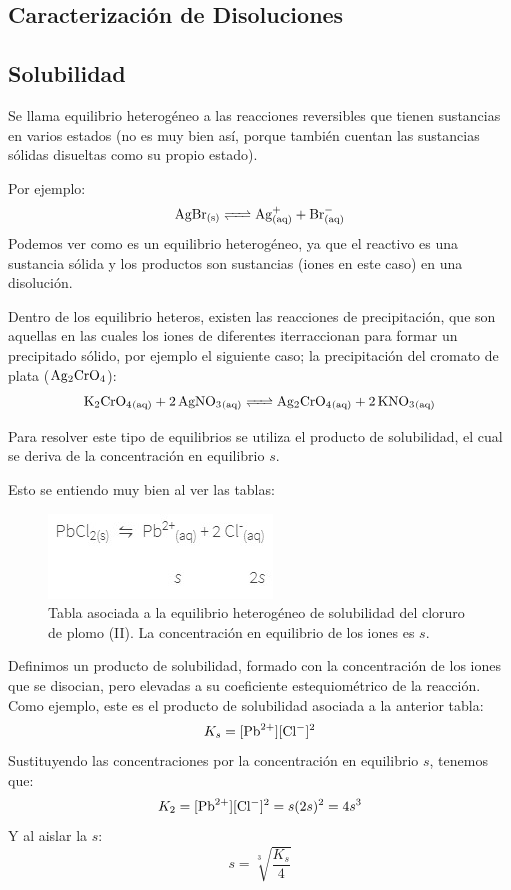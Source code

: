 \documentclass[arial,a4paper,print]{article}
\begin{document}
\subsection{Caracterización de Disoluciones}

\subsection{Solubilidad}
Se llama equilibrio heterogéneo a las reacciones reversibles que tienen sustancias en varios estados (no es muy bien así, porque también cuentan las sustancias sólidas disueltas como su propio estado). 

Por ejemplo:
\begin{equation*}
	\ce{AgBr_{(s)} <=> Ag^+_{(aq)} + Br^-_{(aq)}}
\end{equation*}
Podemos ver como es un equilibrio heterogéneo, ya que el reactivo es una sustancia sólida y los productos son sustancias (iones en este caso) en una disolución. 

Dentro de los equilibrio heteros, existen las reacciones de precipitación, que son aquellas en las cuales los iones de diferentes iterraccionan para formar un precipitado sólido, por ejemplo el siguiente caso; la precipitación del cromato de plata ($\ce{Ag2CrO4}$):
\begin{equation*}
	\ce{K2CrO4_{(aq)} + 2AgNO3_{(aq)} <=> Ag2CrO4_{(aq)} + 2KNO3_{(aq)}}
\end{equation*}

Para resolver este tipo de equilibrios se utiliza el producto de solubilidad, el cual se deriva de la concentración en equilibrio $s$. 

Esto se entiendo muy bien al ver las tablas:
\begin{figure}[H]
	\centering
	\includegraphics[width=0.3\linewidth]{figures/tabla_s}
	\caption{Tabla asociada a la equilibrio heterogéneo de solubilidad del cloruro de plomo (II). La concentración en equilibrio de los iones es $s$.}
	\label{fig:tablas}
\end{figure}

Definimos un producto de solubilidad, formado con la concentración de los iones que se disocian, pero elevadas a su coeficiente estequiométrico de la reacción. Como ejemplo, este es el producto de solubilidad asociada a la anterior tabla:
\begin{equation*}
	K_{s} = [\ce{Pb}^{2+}][\ce{Cl^{-}}]^{2} 
\end{equation*}
Sustituyendo las concentraciones por la concentración en equilibrio $s$, tenemos que:
\begin{equation*}
	K_{2} = [\ce{Pb}^{2+}][\ce{Cl^{-}}]^{2} = s(2s)^{2} = 4s^{3}
\end{equation*}
Y al aislar la $s$:
\begin{equation*}
	s = \sqrt[3]{\frac{K_{s}}{4}}
\end{equation*}
\end{document}
